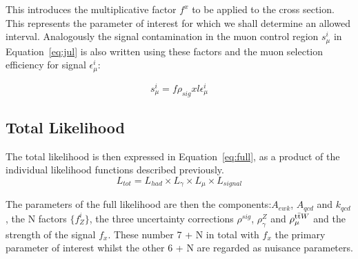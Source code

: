 This introduces the multiplicative factor $f^{x}$ to be applied to the cross section. This represents the parameter of interest for which we shall determine an allowed interval. Analogously the signal contamination in the muon control region $s^{i}_{\mu}$ in Equation~\ref{eq:jul} is also written using these factors and the muon selection efficiency for signal $\epsilon^{i}_{\mu}$:

\begin{equation}
s^{i}_{\mu} = f \rho_{sig} x l \epsilon^{i}_{\mu}
\label{eq:sig}
\end{equation}

\subsection{Total Likelihood}

The total likelihood is then expressed in Equation~\ref{eq:full}, as a product of the individual likelihood functions described previously.
\begin{equation}
L_{tot} = L_{had} \times L_{\gamma} \times L_{\mu} \times L_{signal}
\label{eq:fulll}
\end{equation}

The parameters of the full likelihood are then the \RaT components:$A_{ewk}$, $A_{qcd}$ and $k_{qcd}$, the N factors $\{f^{i}_{Z}\}$, the three uncertainty corrections $\rho^{sig}$, $\rho^{Z}_{\gamma}$ and $\rho^{\textrm{t}\bar{\textrm{t}} W}_{\mu}$ and the strength of the signal $f_{x}$. These number 7 + N in total with $f _{x}$ the primary parameter of interest whilst the other 6 + N are regarded as nuisance parameters.


